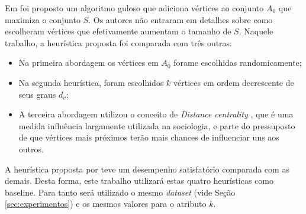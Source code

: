 \documentclass[12pt]{article}
\begin{document}
Em \cite{kempe2003maximizing} foi proposto um algoritmo guloso que adiciona vértices ao conjunto $A_{0}$ que maximiza o conjunto $S$. Os autores não entraram em detalhes sobre como escolheram vértices que efetivamente aumentam o tamanho de $S$. Naquele trabalho, a heurística proposta foi comparada com três outras:
\begin{itemize}
	\item Na primeira abordagem os vértices em $A_{0}$ forame escolhidas randomicamente;
	\item Na segunda heurística, foram escolhidos $k$ vértices em ordem decrescente de seus graus $d_{v}$;
	\item A terceira abordagem utilizou o conceito de \textit{Distance centrality} \cite{scott2012social}, que é uma  medida influência largamente utilizada na sociologia, e parte do pressuposto de que vértices mais próximos terão mais chances de influenciar uns aos outros.
\end{itemize}

A heurística proposta por \cite{kempe2003maximizing}	teve um desempenho satisfatório comparada com as demais. Desta forma, este trabalho utilizará estas quatro heurísticas como baseline. Para tanto será utilizado o mesmo \textit{dataset} (vide Seção \ref{sec:experimentos}) e os mesmos valores para o atributo $k$.

\begin{table}[h]
\centering
{}
\caption{Resultados para diversos valores de k}
\label{tab:results}
\end{table}
\end{document}
